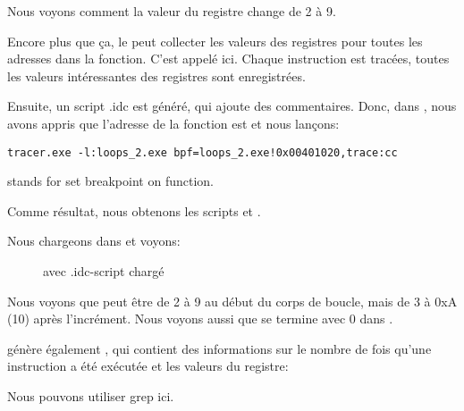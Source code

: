 

Nous voyons comment la valeur du registre \ESI change de 2 à 9.

Encore plus que ça, le \tracer peut collecter les valeurs des registres pour toutes
les adresses dans la fonction. C'est appelé  ici. Chaque instruction est
tracées, toutes les valeurs intéressantes des registres sont enregistrées.

Ensuite, un script \IDA .idc est généré, qui ajoute des commentaires.
Donc, dans \IDA, nous avons appris que l'adresse de la fonction \main est 
et nous lançons:

\begin{lstlisting}
tracer.exe -l:loops_2.exe bpf=loops_2.exe!0x00401020,trace:cc
\end{lstlisting}

 stands for set breakpoint on function.

Comme résultat, nous obtenons les scripts  et .

\clearpage
Nous chargeons  dans \IDA et voyons:

\begin{figure}[H]
\centering
{}
\caption{\IDA avec .idc-script chargé}
\label{fig:loops_IDA_tracer}
\end{figure}

Nous voyons que \ESI peut être de 2 à 9 au début du corps de boucle, mais de 3 à
0xA (10) après l'incrément.
Nous voyons aussi que \main se termine avec 0 dans \EAX.

\tracer génère également , qui contient des informations sur
le nombre de fois qu'une instruction a été exécutée et les valeurs du registre:


\myindex{\GrepUsage}
Nous pouvons utiliser grep ici.

